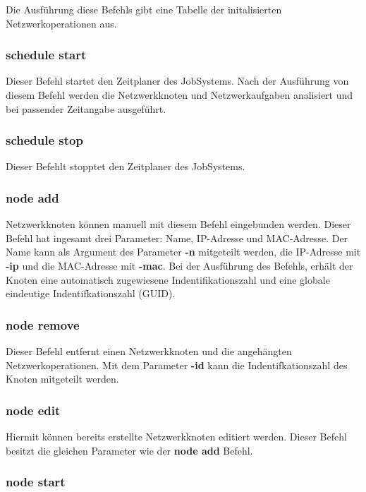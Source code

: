 \documentclass[12pt,a4paper]{report}
\begin{document}
Die Ausführung diese Befehls gibt eine Tabelle der initalisierten Netzwerkoperationen aus.

\subsubsection{schedule start}

Dieser Befehl startet den Zeitplaner des JobSystems. Nach der Ausführung von diesem Befehl werden die Netzwerkknoten und Netzwerkaufgaben analisiert und bei passender Zeitangabe ausgeführt.

\subsubsection{schedule stop}

Dieser Befehlt stopptet den Zeitplaner des JobSystems.

\subsubsection{node add}

Netzwerkknoten können manuell mit diesem Befehl eingebunden werden. Dieser Befehl hat ingesamt drei Parameter: Name, IP-Adresse und MAC-Adresse. Der Name kann als Argument des Parameter \textbf{-n} mitgeteilt werden, die IP-Adresse mit \textbf{-ip} und die MAC-Adresse mit \textbf{-mac}. Bei der Ausführung des Befehls, erhält der Knoten eine automatisch zugewiesene Indentifikationszahl und eine globale eindeutige Indentifkationszahl (GUID).

\subsubsection{node remove}

Dieser Befehl entfernt einen Netzwerkknoten und die angehängten Netzwerkoperationen. Mit dem Parameter \textbf{-id} kann die Indentifkationszahl des Knoten mitgeteilt werden.

\subsubsection{node edit}

Hiermit können bereits erstellte Netzwerkknoten editiert werden. Dieser Befehl besitzt die gleichen Parameter wie der \textbf{node add} Befehl.

\subsubsection{node start}
\end{document}
